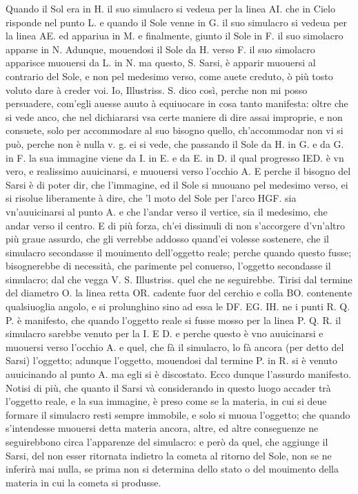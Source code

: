 \documentclass[11pt,twoside,openany]{book}
\begin{document}
Quando il Sol era in H. il suo simulacro si vedeua per la linea AI. che in Cielo risponde nel punto L. e quando il Sole venne in G. il suo simulacro si vedeua per la linea AE. ed appariua in M. e finalmente, giunto il Sole in F. il suo simolacro apparse in N. Adunque, mouendosi il Sole da H. verso F. il suo simolacro apparisce muouersi da L. in N. ma questo, S. Sarsi, è apparir muouersi al contrario del Sole, e non pel medesimo verso, come auete creduto, ò più tosto voluto dare à creder voi. Io, Illustriss. S. dico così, perche non mi posso persuadere, com'egli auesse auuto à equiuocare in cosa tanto manifesta: oltre che si vede anco, che nel dichiararsi vsa certe maniere di dire assai improprie, e non consuete, solo per accommodare al suo bisogno quello, ch'accommodar non vi si può, perche non è nulla v. g. ei si vede, che passando il Sole da H. in G. e da G. in F. la sua immagine viene da I. in E. e da E. in D. il qual progresso IED. è vn vero, e realissimo auuicinarsi, e muouersi verso l'occhio A. E perche il bisogno del Sarsi è di poter dir, che l'immagine, ed il Sole si muouano pel medesimo verso, ei si risolue liberamente à dire, che 'l moto del Sole per l'arco HGF. sia vn'auuicinarsi al punto A. e che l'andar verso il vertice, sia il medesimo, che andar verso il centro. E di più forza, ch'ei dissimuli di non s'accorgere d'vn'altro più graue assurdo, che gli verrebbe addosso quand'ei volesse sostenere, che il simulacro secondasse il mouimento dell'oggetto reale; perche quando questo fusse; bisognerebbe di necessità, che parimente pel conuerso, l'oggetto secondasse il simulacro; dal che vegga V. S. Illustriss. quel che ne seguirebbe. Tirisi dal termine del diametro O. la linea retta OR. cadente fuor del cerchio e colla BO. contenente qualsiuoglia angolo, e si prolunghino sino ad essa le DF. EG. IH. ne i punti R. Q. P. è manifesto, che quando l'oggetto reale si fusse mosso per la linea P. Q. R. il simulacro sarebbe venuto per la I. E D. e perche questo è vno auuicinarsi e muouersi verso l'occhio A. e quel, che fà il simulacro, lo fà ancora (per detto del Sarsi) l'oggetto; adunque l'oggetto, mouendosi dal termine P. in R. si è venuto auuicinando al punto A. ma egli si è discostato. Ecco dunque l'assurdo manifesto. Notisi di più, che quanto il Sarsi và considerando in questo luogo accader trà l'oggetto reale, e la sua immagine, è preso come se la materia, in cui si deue formare il simulacro resti sempre immobile, e solo si muoua l'oggetto; che quando s'intendesse muouersi detta materia ancora, altre, ed altre conseguenze ne seguirebbono circa l'apparenze del simulacro: e però da quel, che aggiunge il Sarsi, del non esser ritornata indietro la cometa al ritorno del Sole, non se ne inferirà mai nulla, se prima non si determina dello stato o del mouimento della materia in cui la cometa si produsse.
\end{document}
